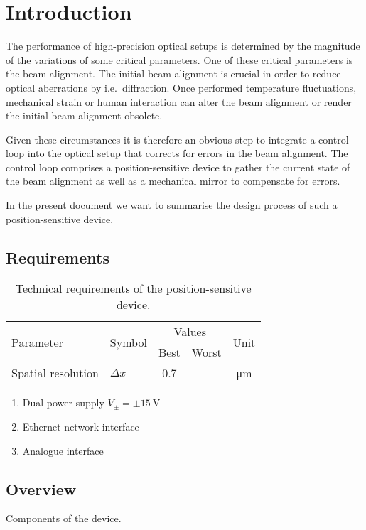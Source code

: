\section{Introduction}

The performance of high-precision optical setups is determined by the magnitude of the variations of some critical parameters.
One of these critical parameters is the beam alignment.
The initial beam alignment is crucial in order to reduce optical aberrations by i.e.\ diffraction.
Once performed temperature fluctuations, mechanical strain or human interaction can alter the beam alignment or render the initial beam alignment obsolete.

Given these circumstances it is therefore an obvious step to integrate a control loop into the optical setup that corrects for errors in the beam alignment.
The control loop comprises a position-sensitive device to gather the current state of the beam alignment as well as a mechanical mirror to compensate for errors. 

In the present document we want to summarise the design process of such a position-sensitive device.

\subsection{Requirements}

\begin{table}[H]
	\centering
	\begin{tabular}{llccc}
		\toprule
			\multirow{2}[3]{*}{Parameter} &
			\multirow{2}[3]{*}{Symbol} &
			\multicolumn{2}{c}{Values} &
			\multirow{2}[3]{*}{Unit} \\
			\cmidrule(lr){3-4} & & Best & Worst & \\
		\midrule
			Spatial resolution & $\Delta x$ & \num{0.7} & & \si{\micro\meter} \\
		\bottomrule
	\end{tabular}
	\caption{Technical requirements of the position-sensitive device.}
\end{table}

\begin{enumerate}
    \item Dual power supply $V_\pm=\pm\SI{15}{\volt}$
    \item Ethernet network interface
    \item Analogue interface
\end{enumerate}

\subsection{Overview}

Components of the device.
